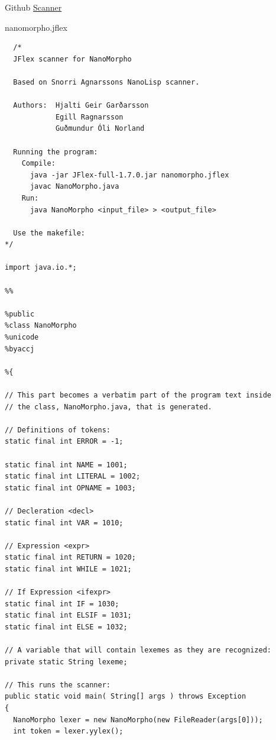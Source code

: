 \documentclass{homework}
\begin{document}

\begin{question}{Github}
  \href{https://github.com/slowpokesheep/thyd_scanner}{Scanner}\\
\end{question}

\begin{question}{nanomorpho.jflex}
\end{question}
\begin{answer}
\begin{verbatim}
  /*
  JFlex scanner for NanoMorpho

  Based on Snorri Agnarssons NanoLisp scanner.

  Authors:  Hjalti Geir Garðarsson
            Egill Ragnarsson
            Guðmundur Óli Norland
  
  Running the program:
    Compile:
      java -jar JFlex-full-1.7.0.jar nanomorpho.jflex
      javac NanoMorpho.java
    Run:
      java NanoMorpho <input_file> > <output_file>
  
  Use the makefile:
*/

import java.io.*;

%%

%public
%class NanoMorpho
%unicode
%byaccj

%{

// This part becomes a verbatim part of the program text inside
// the class, NanoMorpho.java, that is generated.

// Definitions of tokens:
static final int ERROR = -1;

static final int NAME = 1001;
static final int LITERAL = 1002;
static final int OPNAME = 1003;

// Decleration <decl>
static final int VAR = 1010;

// Expression <expr>
static final int RETURN = 1020;
static final int WHILE = 1021;

// If Expression <ifexpr>
static final int IF = 1030;
static final int ELSIF = 1031;
static final int ELSE = 1032;

// A variable that will contain lexemes as they are recognized:
private static String lexeme;

// This runs the scanner:
public static void main( String[] args ) throws Exception
{
  NanoMorpho lexer = new NanoMorpho(new FileReader(args[0]));
  int token = lexer.yylex();
  

\end{verbatim}
\end{answer}
\end{document}
